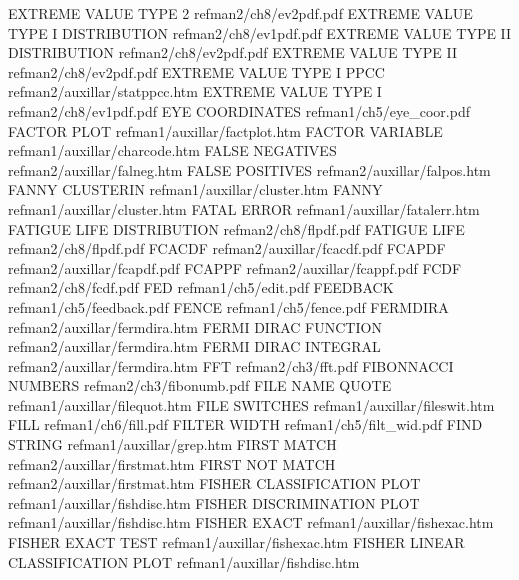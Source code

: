EXTREME VALUE TYPE 2                    refman2/ch8/ev2pdf.pdf
EXTREME VALUE TYPE I DISTRIBUTION       refman2/ch8/ev1pdf.pdf
EXTREME VALUE TYPE II DISTRIBUTION      refman2/ch8/ev2pdf.pdf
EXTREME VALUE TYPE II                   refman2/ch8/ev2pdf.pdf
EXTREME VALUE TYPE I PPCC               refman2/auxillar/statppcc.htm
EXTREME VALUE TYPE I                    refman2/ch8/ev1pdf.pdf
EYE COORDINATES                         refman1/ch5/eye_coor.pdf
FACTOR PLOT                             refman1/auxillar/factplot.htm
FACTOR VARIABLE                         refman1/auxillar/charcode.htm
FALSE NEGATIVES                         refman2/auxillar/falneg.htm
FALSE POSITIVES                         refman2/auxillar/falpos.htm
FANNY CLUSTERIN                         refman1/auxillar/cluster.htm
FANNY                                   refman1/auxillar/cluster.htm
FATAL ERROR                             refman1/auxillar/fatalerr.htm
FATIGUE LIFE DISTRIBUTION               refman2/ch8/flpdf.pdf
FATIGUE LIFE                            refman2/ch8/flpdf.pdf
FCACDF                                  refman2/auxillar/fcacdf.pdf
FCAPDF                                  refman2/auxillar/fcapdf.pdf
FCAPPF                                  refman2/auxillar/fcappf.pdf
FCDF                                    refman2/ch8/fcdf.pdf
FED                                     refman1/ch5/edit.pdf
FEEDBACK                                refman1/ch5/feedback.pdf
FENCE                                   refman1/ch5/fence.pdf
FERMDIRA                                refman2/auxillar/fermdira.htm
FERMI DIRAC FUNCTION                    refman2/auxillar/fermdira.htm
FERMI DIRAC INTEGRAL                    refman2/auxillar/fermdira.htm
FFT                                     refman2/ch3/fft.pdf
FIBONNACCI NUMBERS                      refman2/ch3/fibonumb.pdf
FILE NAME QUOTE                         refman1/auxillar/filequot.htm
FILE SWITCHES                           refman1/auxillar/fileswit.htm
FILL                                    refman1/ch6/fill.pdf
FILTER WIDTH                            refman1/ch5/filt_wid.pdf
FIND STRING                             refman1/auxillar/grep.htm
FIRST MATCH                             refman2/auxillar/firstmat.htm
FIRST NOT MATCH                         refman2/auxillar/firstmat.htm
FISHER CLASSIFICATION PLOT              refman1/auxillar/fishdisc.htm
FISHER DISCRIMINATION PLOT              refman1/auxillar/fishdisc.htm
FISHER EXACT                            refman1/auxillar/fishexac.htm
FISHER EXACT TEST                       refman1/auxillar/fishexac.htm
FISHER LINEAR CLASSIFICATION PLOT       refman1/auxillar/fishdisc.htm

